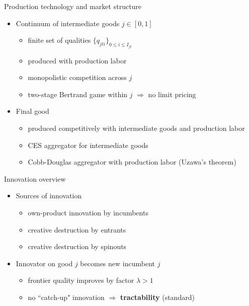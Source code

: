 \documentclass[english,usenames,dvipsnames]{beamer}
\begin{document}
\begin{frame}{Production technology and market structure}\label{model:production_overview}
	\begin{itemize}
		\item Continuum of intermediate goods $j \in [0,1]$ \hyperlink{intermediate_goods_production}{}
		\begin{itemize}
			\item finite set of qualities $\{q_{jti}\}_{0 \le i \le I_{jt}}$
			\item produced with production labor 
			\item monopolistic competition across $j$
			\item two-stage Bertrand game within $j$ $\Rightarrow$ no limit pricing
		\end{itemize}
		\smallskip
		\item Final good \hyperlink{main:final_goods_production}{}
		\begin{itemize}
			\item produced competitively with intermediate goods and production labor
			\item CES aggregator for intermediate goods
			\item Cobb-Douglas aggregator with production labor (Uzawa's theorem)
		\end{itemize}
	\end{itemize}
\end{frame}

\begin{frame}{Innovation overview}\label{model:innovation_overview}
	\begin{itemize}
		\item<+-> Sources of innovation \hyperlink{model:innovation_by_incumbents_and_entrants}{}
		\begin{itemize}
			\item own-product innovation by incumbents  
			\item creative destruction by entrants 
			\item creative destruction by spinouts
		\end{itemize}
		\medskip
		\item<+-> Innovator on good $j$ becomes new incumbent $j$
		\begin{itemize}
			\item<+-> frontier quality improves by factor $\lambda > 1$
			\item<+-> no ``catch-up" innovation $\Rightarrow$ \alert{\textbf{tractability}} (standard)
		\end{itemize}
	\end{itemize}
\end{frame}
\end{document}
